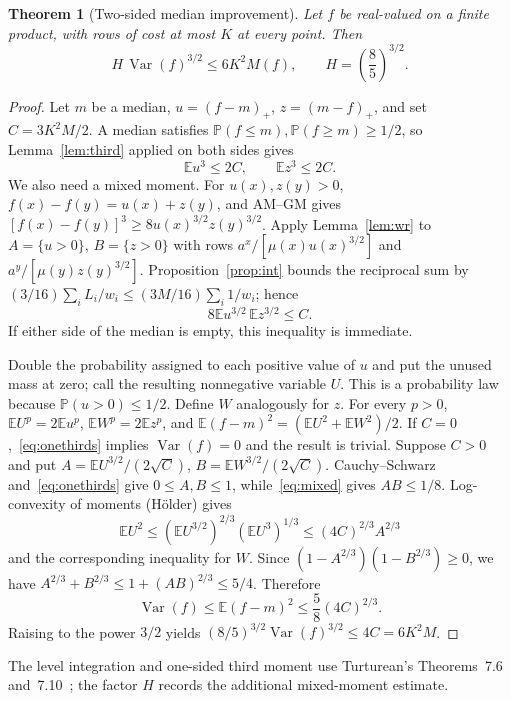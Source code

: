 \documentclass[11pt]{article}
\numberwithin{equation}{section}
\newtheorem{theorem}{Theorem}[section]
\theoremstyle{remark}
\newcommand{\E}{\mathbb E}
\newcommand{\Prb}{\mathbb P}
\newcommand{\Var}{\operatorname{Var}}
\newcommand{\pos}[1]{(#1)_{+}}
\begin{document}
\begin{theorem}[Two-sided median improvement]\label{thm:median}
Let $f$ be real-valued on a finite product, with rows of cost at most $K$ at every point. Then
\begin{equation}\label{eq:median}
 H\,\Var(f)^{3/2}\le 6K^2M(f),\qquad H=\left(\frac85\right)^{3/2}.
\end{equation}
\end{theorem}
\begin{proof}
Let $m$ be a median, $u=\pos{f-m}$, $z=\pos{m-f}$, and set $C=3K^2M/2$. A median satisfies $\Prb(f\le m),\Prb(f\ge m)\ge1/2$, so Lemma~\ref{lem:third} applied on both sides gives
\begin{equation}\label{eq:onethirds}
 \E u^3\le2C,\qquad\E z^3\le2C.
\end{equation}
We also need a mixed moment. For $u(x),z(y)>0$, $f(x)-f(y)=u(x)+z(y)$, and AM--GM gives
$[f(x)-f(y)]^3\ge8u(x)^{3/2}z(y)^{3/2}$.
Apply Lemma~\ref{lem:wr} to $A=\{u>0\}$, $B=\{z>0\}$ with rows
$a^x/[\mu(x)u(x)^{3/2}]$ and $a^y/[\mu(y)z(y)^{3/2}]$. Proposition~\ref{prop:int} bounds the reciprocal sum by $(3/16)\sum_iL_i/w_i\le(3M/16)\sum_i1/w_i$; hence
\begin{equation}\label{eq:mixed}
 8\E u^{3/2}\,\E z^{3/2}\le C.
\end{equation}
If either side of the median is empty, this inequality is immediate.

Double the probability assigned to each positive value of $u$ and put the unused mass at zero; call the resulting nonnegative variable $U$. This is a probability law because $\Prb(u>0)\le1/2$. Define $W$ analogously for $z$. For every $p>0$, $\E U^p=2\E u^p$, $\E W^p=2\E z^p$, and
$\E(f-m)^2=(\E U^2+\E W^2)/2$.
If $C=0$,~\eqref{eq:onethirds} implies $\Var(f)=0$ and the result is trivial. Suppose $C>0$ and put
$A=\E U^{3/2}/(2\sqrt C)$, $B=\E W^{3/2}/(2\sqrt C)$.
Cauchy--Schwarz and~\eqref{eq:onethirds} give $0\le A,B\le1$, while~\eqref{eq:mixed} gives $AB\le1/8$. Log-convexity of moments (H\"older) gives
\[
 \E U^2\le(\E U^{3/2})^{2/3}(\E U^3)^{1/3}
 \le(4C)^{2/3}A^{2/3}
\]
and the corresponding inequality for $W$. Since
$(1-A^{2/3})(1-B^{2/3})\ge0$, we have
$A^{2/3}+B^{2/3}\le1+(AB)^{2/3}\le5/4$. Therefore
\[
 \Var(f)\le\E(f-m)^2\le\frac58(4C)^{2/3}.
\]
Raising to the power $3/2$ yields $(8/5)^{3/2}\Var(f)^{3/2}\le4C=6K^2M$.
\end{proof}
The level integration and one-sided third moment use Turturean's Theorems~7.6 and~7.10~\cite{Tur26}; the factor $H$ records the additional mixed-moment estimate.
\end{document}

